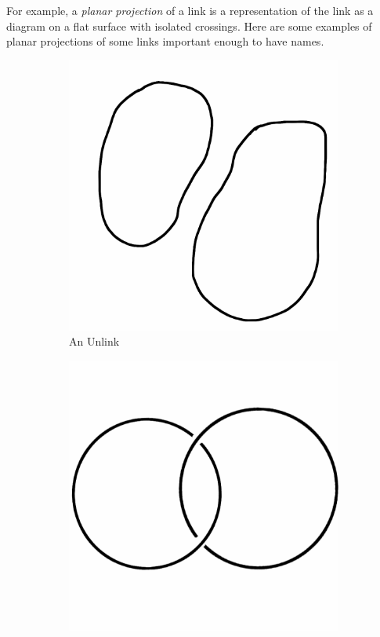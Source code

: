 \documentclass[12pt,letterpaper]{article}
\theoremstyle{definition}
\begin{document}
For example, a \emph{planar projection} of a link is a representation of the link as a diagram on a flat surface with isolated crossings.
Here are some examples of planar projections of some links important enough to have names.

\begin{figure}[h]
    \centering
    \begin{subfigure}{.3\textwidth}
        \centering
        \includegraphics[width=\textwidth]{knotpics/unlink2.png}
        \caption{An Unlink}
    \end{subfigure}
    \quad
    \begin{subfigure}{.3\textwidth}
        \centering
        \includegraphics[width=\textwidth]{knotpics/hopf.png}

\end{subfigure}
\end{figure}
\end{document}
